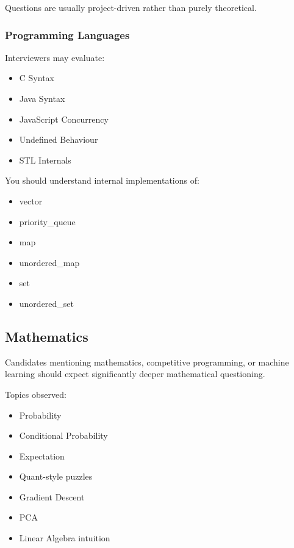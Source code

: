 \documentclass[11pt,a4paper]{article}
\begin{document}
Questions are usually project-driven rather than purely theoretical.


\subsubsection{Programming Languages}

Interviewers may evaluate:

\begin{itemize}
	\item C Syntax
	\item Java Syntax
	\item JavaScript Concurrency
	\item Undefined Behaviour
	\item STL Internals
\end{itemize}

You should understand internal implementations of:

\begin{itemize}
	\item vector
	\item priority\_queue
	\item map
	\item unordered\_map
	\item set
	\item unordered\_set
\end{itemize}


\subsection{Mathematics}

Candidates mentioning mathematics, competitive programming, or machine learning should expect significantly deeper mathematical questioning.

Topics observed:

\begin{itemize}
	\item Probability
	\item Conditional Probability
	\item Expectation
	\item Quant-style puzzles
	\item Gradient Descent
	\item PCA
	\item Linear Algebra intuition
\end{itemize}
\end{document}
